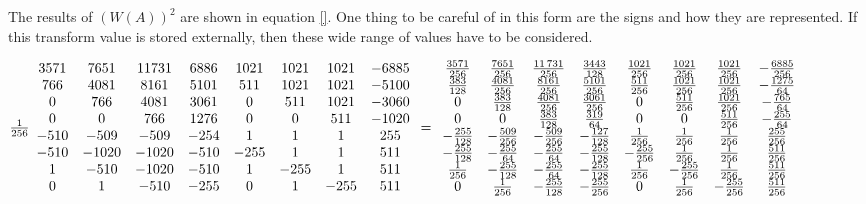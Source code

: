 \documentclass{article}
\begin{document}
The results of $(W(A))^2$ are shown in equation \ref{}.  One thing to be careful of in this form are the signs and how they are represented.  If this transform value is stored externally, then these wide range of values have to be considered.    

$\frac{1}{256} 
\begin{array}{cccccccc}
3571 & 7651 & 11731 & 6886 & 1021 & 1021 & 1021 & -6885 \\ 
766 & 4081 & 8161 & 5101 & 511 & 1021 & 1021 & -5100 \\ 
0 & 766 & 4081 & 3061 & 0 & 511 & 1021 & -3060 \\ 
0 & 0 & 766 & 1276 & 0 & 0 & 511 & -1020 \\ 
-510 & -509 & -509 & -254 & 1 & 1 & 1 & 255 \\ 
-510 & -1020 & -1020 & -510 & -255 & 1 & 1 & 511 \\ 
1 & -510 & -1020 & -510 & 1 & -255 & 1 & 511 \\ 
0 & 1 & -510 & -255 & 0 & 1 & -255 & 511
\end{array}
=\allowbreak 
\begin{array}{cccccccc}
\frac{3571}{256} & \frac{7651}{256} & \frac{11\,731}{256} & \frac{3443}{128}
& \frac{1021}{256} & \frac{1021}{256} & \frac{1021}{256} & -\frac{6885}{256}
\\ 
\frac{383}{128} & \frac{4081}{256} & \frac{8161}{256} & \frac{5101}{256} & 
\frac{511}{256} & \frac{1021}{256} & \frac{1021}{256} & -\frac{1275}{64} \\ 
0 & \frac{383}{128} & \frac{4081}{256} & \frac{3061}{256} & 0 & \frac{511}{%
256} & \frac{1021}{256} & -\frac{765}{64} \\ 
0 & 0 & \frac{383}{128} & \frac{319}{64} & 0 & 0 & \frac{511}{256} & -\frac{%
255}{64} \\ 
-\frac{255}{128} & -\frac{509}{256} & -\frac{509}{256} & -\frac{127}{128} & 
\frac{1}{256} & \frac{1}{256} & \frac{1}{256} & \frac{255}{256} \\ 
-\frac{255}{128} & -\frac{255}{64} & -\frac{255}{64} & -\frac{255}{128} & -%
\frac{255}{256} & \frac{1}{256} & \frac{1}{256} & \frac{511}{256} \\ 
\frac{1}{256} & -\frac{255}{128} & -\frac{255}{64} & -\frac{255}{128} & 
\frac{1}{256} & -\frac{255}{256} & \frac{1}{256} & \frac{511}{256} \\ 
0 & \frac{1}{256} & -\frac{255}{128} & -\frac{255}{256} & 0 & \frac{1}{256}
& -\frac{255}{256} & \frac{511}{256}
\end{array}
\allowbreak $
\bigskip
\end{document}
